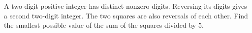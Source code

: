 A two-digit positive integer has distinct nonzero digits. Reversing its digits gives a second two-digit integer. The two squares are also reversals of each other. Find the smallest possible value of the sum of the squares divided by $5$.
